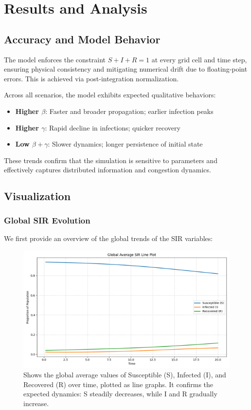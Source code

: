 \section{Results and Analysis}

\subsection{Accuracy and Model Behavior}
The model enforces the constraint \( S + I + R = 1 \) at every grid cell and time step, ensuring physical consistency and mitigating numerical drift due to floating-point errors. This is achieved via post-integration normalization.

Across all scenarios, the model exhibits expected qualitative behaviors:
\begin{itemize}
    \item \textbf{Higher \( \beta \)}: Faster and broader propagation; earlier infection peaks
    \item \textbf{Higher \( \gamma \)}: Rapid decline in infections; quicker recovery
    \item \textbf{Low \( \beta + \gamma \)}: Slower dynamics; longer persistence of initial state
\end{itemize}

These trends confirm that the simulation is sensitive to parameters and effectively captures distributed information and congestion dynamics.

\subsection{Visualization}

\subsubsection{Global SIR Evolution}
We first provide an overview of the global trends of the SIR variables:
\begin{figure}[H]
    \centering
    \includegraphics[width=14cm]{Images/pic5.png}
    \caption*{Shows the global average values of Susceptible (S), Infected (I), and Recovered (R) over time, plotted as line graphs. It confirms the expected dynamics: S steadily decreases, while I and R gradually increase.}
    \label{fig:sir_line_plot}
\end{figure}

